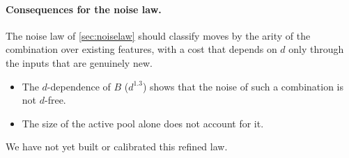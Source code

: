 \paragraph{Consequences for the noise law.} The noise law of \cref{sec:noiselaw} should classify moves by the arity of the combination over existing features, with a cost that depends on $d$ only through the inputs that are genuinely new.
\begin{itemize}
\item The $d$-dependence of $B$ ($d^{1.3}$) shows that the noise of such a combination is not $d$-free.
\item The size of the active pool alone does not account for it.
\end{itemize}
We have not yet built or calibrated this refined law.
